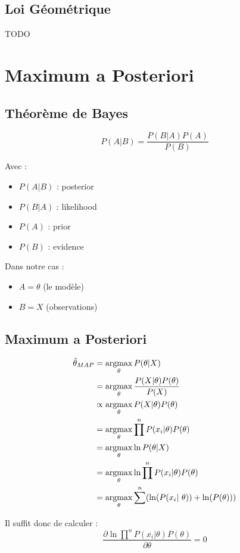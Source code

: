 \documentclass{article}
\begin{document}
\subsection{Loi Géométrique}

TODO



\section{Maximum a Posteriori}

\subsection{Théorème de Bayes}

\begin{equation}
    P(A|B) = \frac{P(B|A)P(A)}{P(B)}
\end{equation}

Avec : 
\begin{itemize}
    \item $P(A|B)$ : posterior
    \item $P(B|A)$ : likelihood
    \item $P(A)$ : prior
    \item $P(B)$ : evidence
\end{itemize}

Dans notre cas :
\begin{itemize}
    \item $A = \theta$ (le modèle)
    \item $B = X$ (observations)
\end{itemize}


\subsection{Maximum a Posteriori}

\begin{align*}
    \hat\theta_{MAP} & = \argmax\limits_{\theta} P(\theta | X) \\
    & = \argmax\limits_{\theta} \frac{P(X | \theta)P(\theta)}{P(X)} \\
    & \propto \argmax\limits_{\theta} P(X | \theta)P(\theta) \\
    & = \argmax\limits_{\theta} \prod\limits^n P(x_i | \theta)P(\theta) \\
    & = \argmax\limits_{\theta} \ln P(\theta | X) \\
    & = \argmax\limits_{\theta} \ln \prod\limits^n P(x_i | \theta)P(\theta) \\
    & = \argmax\limits_{\theta} \sum\limits^n (\ln(P(x_i | \theta)) + \ln(P(\theta)))
\end{align*}

Il suffit donc de calculer : 
\begin{equation*}
    \frac{
        \partial \ln \prod\limits^n P(x_i | \theta)P(\theta)
    }{
        \partial \theta
    } = 0
\end{equation*}
\end{document}
